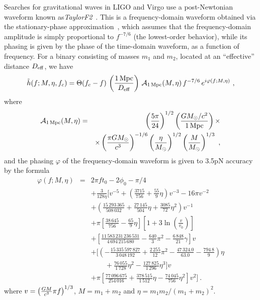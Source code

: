 Searches for gravitational waves in LIGO and Virgo use a
post-Newtonian waveform known
as\textit{TaylorF2}~\cite{Abbott:2008}. This is a frequency-domain
waveform obtained via the stationary-phase
approximation~\cite{CutlerFlanagan1994}, which assumes that the
frequency-domain amplitude is simply proportional to $f^{-7/6}$ (the
lowest-order behavior), while its phasing is given by the phase of the
time-domain waveform, as a function of frequency.  For a binary
consisting of masses $m_{1}$ and $m_{2}$, located at an ``effective''
distance $D_{\mathrm{eff}}$, we have
\begin{equation}
  \tilde{h}(f; M, \eta, f_{c}) =
  \Theta(f_c - f)\, \left(\frac{\unit[1]{Mpc}}{\deff}\right)\,
  {\mathcal{A}}_{\unit[1]{Mpc}}(M,\eta)\, f^{-7/6}\,
  \e^{i\varphi(f;M,\eta)}\ ,
  \label{e:waveform}
\end{equation}
where
\begin{eqnarray} {\mathcal{A}}_{\unit[1]{Mpc}}(M,\eta) &= &
  \left(\frac{5\pi}{24}\right)^{1/2}
  \left(\frac{\G \MSun/\c^2}{\unit[1]{Mpc}}\right) \times \nonumber \\
  &\quad & \times \left(\frac{\pi \G \MSun}{\c^3}\right)^{-1/6}
  \left(\frac{\eta}{\MSun}\right)^{1/2}
  \left(\frac{M}{\MSun}\right)^{1/3}\ ,
\end{eqnarray}
and the phasing $\varphi$ of the frequency-domain waveform is given to
3.5pN accuracy by the formula~\cite{Blanchet.2002,Blanchet.2004}
\begin{eqnarray}
  \varphi(f;M,\eta) &=& 2\pi ft_0-2\phi_0-\pi/4 \nonumber \\
  &&+ \frac{3}{128\eta}\Bigg[v^{-5}
  +\left(\frac{3715}{756}+\frac{55}{9}\eta\right)v^{-3}-16\pi v^{-2} \nonumber \\
  &&+ \left(\frac{15\,293\,365}{508\,032}+\frac{27\,145}{504}\eta
    +\frac{3085}{72}\eta^2\right)v^{-1} \nonumber \\
  &&+ \pi \left[ \frac{38\,645}{756} -
    \frac{65}{9}\eta \right] \left[1 + 3
    \ln\left(\frac{v}{v_0}\right) \right] \nonumber \\
  &&+ \left[\frac{11\,583\,231\,236\,531}{4\,694\,215\,680}
    - \frac{640}{3} \pi^2 - \frac{6\,848}{21} \gamma \right] v \nonumber \\
  &&+ \bigg[\left(-\frac{15\,335\,597\,827}{3\,048\,192} +
    \frac{2\,255}{12} \pi^2 - \frac{47\,324.0}{63.0} -
    \frac{794\,8}{9}\right) \eta \nonumber \\
  & & \qquad + \frac{76\,055}{1\,728} \eta^2
  - \frac{127\,825}{1\,296} \eta^3 \bigg] v \nonumber \\ 
  &&+ \pi
  \left[ \frac{77\,096\,675}{254\,016} + \frac{378\,515}{1\,512}
    \eta - \frac{74\,045}{756} \eta^2 \right] v^2\Bigg]\ .
\end{eqnarray}
where $v = \left(\frac{G M}{c^3}\pi f\right)^{1/3}$, $M = m_{1} +
m_{2}$ and $\eta =m_1 m_2/(m_1+m_2)^2$.


